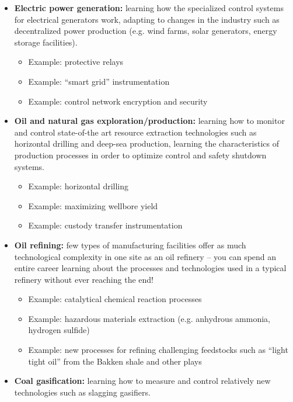 \begin{itemize}
\item{} {\bf Electric power generation:} learning how the specialized control systems for electrical generators work, adapting to changes in the industry such as decentralized power production (e.g. wind farms, solar generators, energy storage facilities).
\begin{itemize}

\item{} Example: protective relays
\item{} Example: ``smart grid'' instrumentation
\item{} Example: control network encryption and security
\end{itemize}
\item{} {\bf Oil and natural gas exploration/production:} learning how to monitor and control state-of-the art resource extraction technologies such as horizontal drilling and deep-sea production, learning the characteristics of production processes in order to optimize control and safety shutdown systems.
\begin{itemize}

\item{} Example: horizontal drilling
\item{} Example: maximizing wellbore yield
\item{} Example: custody transfer instrumentation
\end{itemize}
\item{} {\bf Oil refining:} few types of manufacturing facilities offer as much technological complexity in one site as an oil refinery -- you can spend an entire career learning about the processes and technologies used in a typical refinery without ever reaching the end!
\begin{itemize}

\item{} Example: catalytical chemical reaction processes
\item{} Example: hazardous materials extraction (e.g. anhydrous ammonia, hydrogen sulfide)
\item{} Example: new processes for refining challenging feedstocks such as ``light tight oil'' from the Bakken shale and other plays
\end{itemize}
\item{} {\bf Coal gasification:} learning how to measure and control relatively new technologies such as slagging gasifiers.
\begin{itemize}


\end{itemize}
\end{itemize}
